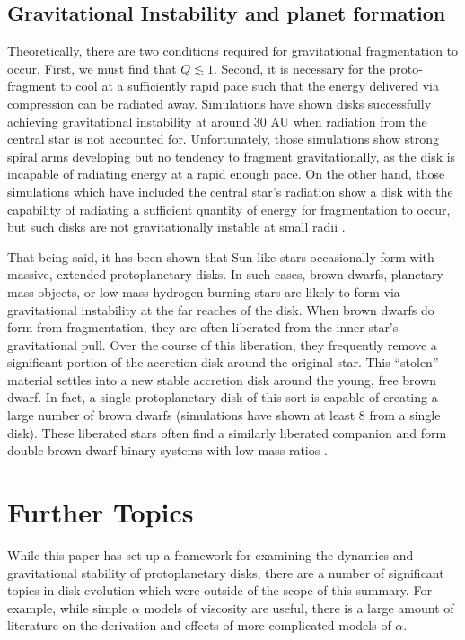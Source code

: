 \documentclass[aps,pra, twocolumn]{revtex4-1}
\begin{document}
\subsection{\label{section 3.3} Gravitational Instability and planet formation}
Theoretically, there are two conditions required for gravitational fragmentation to occur.  First, we must find that $Q \lesssim 1$.  Second, it is necessary for the proto-fragment to cool at a sufficiently rapid pace such that the energy delivered via compression can be radiated away.  Simulations have shown disks successfully achieving gravitational instability at around 30 AU when radiation from the central star is not accounted for.  Unfortunately, those simulations show strong spiral arms developing but no tendency to fragment gravitationally, as the disk is incapable of radiating energy at a rapid enough pace.  On the other hand, those simulations which have included the central star's radiation show a disk with the capability of radiating a sufficient quantity of energy for fragmentation to occur, but such disks are not gravitationally instable at small radii \cite{whitworth2007}.

That being said, it has been shown that Sun-like stars occasionally form with massive, extended protoplanetary disks.  In such cases, brown dwarfs, planetary mass objects, or low-mass hydrogen-burning stars are likely to form via gravitational instability at the far reaches of the disk.  When brown dwarfs do form from fragmentation, they are often liberated from the inner star's gravitational pull.  Over the course of this liberation, they frequently remove a significant portion of the accretion disk around the original star.  This ``stolen'' material settles into a new stable accretion disk around the young, free brown dwarf.  In fact, a single protoplanetary disk of this sort is capable of creating a large number of brown dwarfs (simulations have shown at least 8 from a single disk).  These liberated stars often find a similarly liberated companion and form double brown dwarf binary systems with low mass ratios \cite{hubber2007}.  



\section{\label{section 4} Further Topics}
While this paper has set up a framework for examining the dynamics and gravitational stability of protoplanetary disks, there are a number of significant topics in disk evolution which were outside of the scope of this summary.  For example, while simple $\alpha$ models of viscosity are useful, there is a large amount of literature on the derivation and effects of more complicated models of $\alpha$.  
\end{document}

